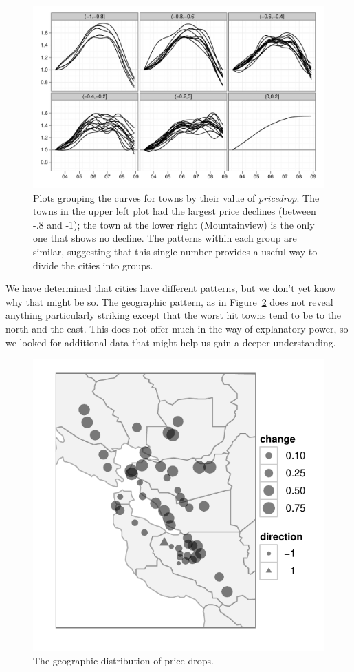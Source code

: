 \documentclass[oneside]{article}
\begin{document}
\begin{figure}[htbp]
  \centering
    \includegraphics[width=0.75\linewidth]{cities-indexed-grouped}
  \caption{Plots grouping the curves for towns by their value of {\em pricedrop}.  The towns in the upper left plot had the largest price declines (between -.8 and -1); the town at the lower right (Mountainview) is the only one that shows no decline.  The patterns within each group are similar, suggesting that this single number provides a useful way to divide the cities into groups.}
  \label{fig:groups}
\end{figure}

We have determined that cities have different patterns, but we don't yet know why that might be so.  The geographic pattern, as in Figure~\ref{fig:geo} does not reveal anything particularly striking except that the worst hit towns tend to be to the north and the east. This does not offer much in the way of explanatory power, so we looked for additional data that might help us gain a deeper understanding. 

\begin{figure}[htbp]
  \centering
    \includegraphics[width=0.5\linewidth]{cities-geo-changes}
  \caption{The geographic distribution of price drops.}
  \label{fig:geo}
\end{figure}
\end{document}
